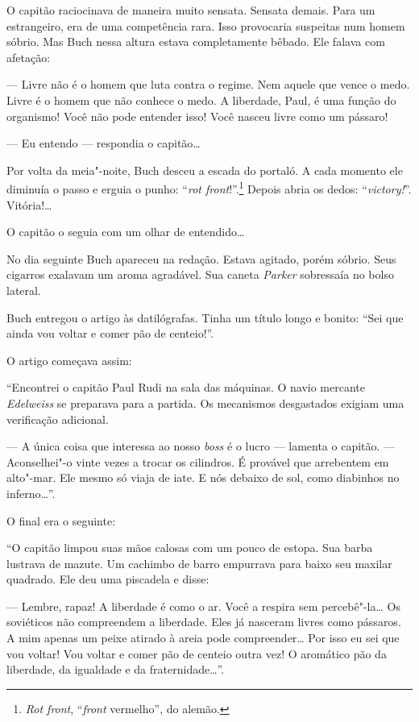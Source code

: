 O capitão raciocinava de maneira muito sensata. Sensata demais. Para um
estrangeiro, era de uma competência rara. Isso provocaria suspeitas num
homem sóbrio. Mas Buch nessa altura estava completamente bêbado. Ele
falava com afetação:

--- Livre não é o homem que luta contra o regime. Nem aquele que vence o
medo. Livre é o homem que não conhece o medo. A liberdade, Paul, é uma
função do organismo! Você não pode entender isso! Você nasceu livre como
um pássaro!

--- Eu entendo --- respondia o capitão\ldots{}

Por volta da meia"-noite, Buch desceu a escada do portaló. A cada momento
ele diminuía o passo e erguia o punho: ``\emph{rot front}!''.\footnote{\emph{Rot
  front}, ``\emph{front} vermelho'', do alemão.} Depois abria os
dedos: ``\emph{victory!}''. Vitória!\ldots{}

O capitão o seguia com um olhar de entendido\ldots{}

No dia seguinte Buch apareceu na redação. Estava agitado, porém sóbrio.
Seus cigarros exalavam um aroma agradável. Sua caneta \emph{Parker}
sobressaía no bolso lateral.

Buch entregou o artigo às datilógrafas. Tinha um título longo e bonito:
``Sei que ainda vou voltar e comer pão de centeio!''.

O artigo começava assim:

``Encontrei o capitão Paul Rudi na sala das máquinas. O navio mercante
\emph{Edelweiss} se preparava para a partida. Os mecanismos desgastados
exigiam uma verificação adicional.

--- A única coisa que interessa ao nosso \emph{boss} é o lucro ---
lamenta o capitão. --- Aconselhei"-o vinte vezes a trocar os cilindros. É
provável que arrebentem em alto"-mar. Ele mesmo só viaja de iate. E nós
debaixo de sol, como diabinhos no inferno\ldots{}''.

O final era o seguinte:

``O capitão limpou suas mãos calosas com um pouco de estopa. Sua barba
lustrava de mazute. Um cachimbo de barro empurrava para baixo seu
maxilar quadrado. Ele deu uma piscadela e disse:

--- Lembre, rapaz! A liberdade é como o ar. Você a respira sem
percebê"-la\ldots{} Os soviéticos não compreendem a liberdade. Eles já
nasceram livres como pássaros. A mim apenas um peixe atirado à areia
pode compreender\ldots{} Por isso eu sei que vou voltar! Vou voltar e comer
pão de centeio outra vez! O aromático pão da liberdade, da igualdade e
da fraternidade\ldots{}''.

